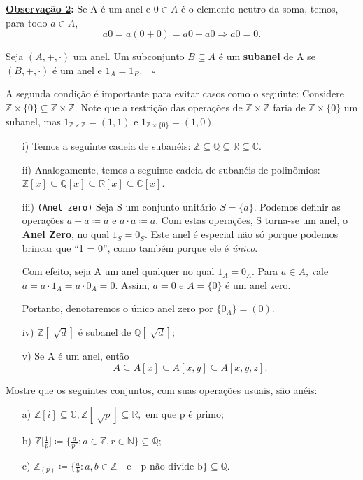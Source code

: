 \documentclass[AlgebraII/algebraII_notes.tex]{subfiles}
\begin{document}
\textbf{\underline{Observação 2}:} Se A é um anel e \(0\in A\) é o elemento neutro da soma, temos, para todo \(a\in A\),
\[
	a0 = a(0+0) = a0 + a0 \Rightarrow a0 = 0.
\]
\begin{def*}
	Seja \((A, +, \cdot )\) um anel. Um subconjunto \(B\subseteq{A}\) é um \textbf{subanel} de A se \((B, +, \cdot )\) é um anel e \(1_{A} = 1_{B}.\quad\square\)
\end{def*}
A segunda condição é importante para evitar casos como o seguinte: Considere \(\mathbb{Z}\times \{0\}\subseteq{\mathbb{Z}\times \mathbb{Z}}.\) Note que a restrição
das operações de \(\mathbb{Z}\times \mathbb{Z}\) faria de \(\mathbb{Z}\times \{0\}\) um subanel, mas \(1_{\mathbb{Z}\times \mathbb{Z}} = (1, 1)\) e \(1_{\mathbb{Z}\times\{0\}}=(1, 0).\)
\begin{example}
	\begin{itemize}
		\item[i)] Temos a seguinte cadeia de subanéis: \(\mathbb{Z}\subseteq{\mathbb{Q}}\subseteq{\mathbb{R}}\subseteq{\mathbb{C}}.\)
		\item[ii)] Analogamente, temos a seguinte cadeia de subanéis de polinômios: \(\mathbb{Z}[x]\subseteq{\mathbb{Q}[x]}\subseteq{\mathbb{R}[x]}\subseteq{\mathbb{C}[x]}\).
		\item[iii)]\texttt{(Anel zero)} Seja S um conjunto unitário \(S = \{a\}.\) Podemos definir as operações \(a + a\coloneqq a\) e \(a \cdot a\coloneqq a\). Com estas operações,
		      S torna-se um anel, o \textbf{Anel Zero}, no qual \(1_{S} = 0_{S}\). Este anel é especial não só porque podemos brincar que ``1 = 0'', como também porque ele é \textit{único}.

		      Com efeito, seja A um anel qualquer no qual \(1_{A} = 0_{A}\). Para \(a\in A\), vale \(a = a \cdot 1_{A} = a \cdot 0_{A} = 0.\) Assim, \(a = 0\) e \(A = \{0\}\) é
		      um anel zero.

		      Portanto, denotaremos o único anel zero por \(\{0_{A}\} = (0).\)
		\item[iv)] \(\mathbb{Z}[\sqrt[]{d}]\) é subanel de \(\mathbb{Q}[\sqrt[]{d}]\);
		\item[v)] Se A é um anel, então
		      \[
			      A\subseteq A[x] \subseteq A[x, y] \subseteq A[x, y, z].
		      \]
	\end{itemize}
\end{example}
\begin{example}[Exercícios]
	Mostre que os seguintes conjuntos, com suas operações usuais, são anéis:
	\begin{itemize}
		\item[a)] \(\mathbb{Z}[i] \subseteq{\mathbb{C}}, \mathbb{Z}[\sqrt[]{p}]\subseteq{\mathbb{R}},\) em que p é primo;
		\item[b)] \(\mathbb{Z}\biggl[\frac{1}{p}\biggr]\coloneqq \biggl\{\frac{a}{p^{r}}: a\in \mathbb{Z}, r\in \mathbb{N}\biggr\}\subseteq{\mathbb{Q}}\);
		\item[c)] \(\mathbb{Z}_{(p)}\coloneqq \biggl\{\frac{a}{b}: a, b\in \mathbb{Z}\quad \text{e}\quad \text{p não divide b} \biggr\}\subseteq{\mathbb{Q}}\).
	\end{itemize}
\end{example}
\end{document}
